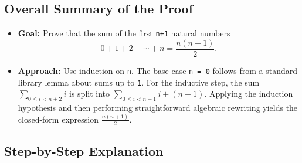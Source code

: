 \documentclass[letterpaper]{article}
\begin{document}
\subsection*{Overall Summary of the Proof}
\begin{itemize}
  \item \textbf{Goal:} Prove that the sum of the first \texttt{n+1} natural numbers 
    \[
      0 + 1 + 2 + \cdots + n 
      = \frac{n(n+1)}{2}.
    \]
  \item \textbf{Approach:} Use induction on \texttt{n}. The base case \texttt{n = 0} follows from 
    a standard library lemma about sums up to \texttt{1}. For the inductive step, 
    the sum \(\sum_{0 \le i < n+2} i\) is split into \(\sum_{0 \le i < n+1} i + (n+1)\). 
    Applying the induction hypothesis and then performing straightforward algebraic 
    rewriting yields the closed-form expression \(\frac{n(n+1)}{2}\).

\end{itemize}

\subsection*{Step-by-Step Explanation}
\end{document}
